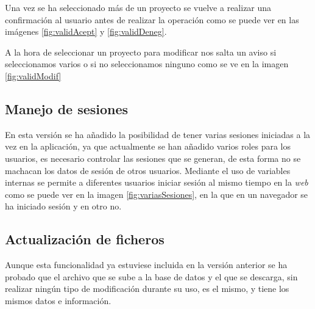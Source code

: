 Una vez se ha seleccionado más de un proyecto se vuelve a realizar una confirmación al usuario antes de realizar la operación como se puede ver en las imágenes \ref{fig:validAcept} y \ref{fig:validDeneg}.


A la hora de seleccionar un proyecto para modificar nos salta un aviso si seleccionamos varios o si no seleccionamos ninguno como se ve en la imagen \ref{fig:validModif}


\subsection{Manejo de sesiones}

En esta versión se ha añadido la posibilidad de tener varias sesiones iniciadas a la vez en la aplicación, ya que actualmente se han añadido varios roles para los usuarios, es necesario controlar las sesiones que se generan, de esta forma no se machacan los datos de sesión de otros usuarios. Mediante el uso de variables internas se permite a diferentes usuarios iniciar sesión al mismo tiempo en la \emph{web} como se puede ver en la imagen \ref{fig:variasSesiones}, en la que en un navegador se ha iniciado sesión y en otro no.


\subsection{Actualización de ficheros}

Aunque esta funcionalidad ya estuviese incluida en la versión anterior se ha probado que el archivo que se sube a la base de datos y el que se descarga, sin realizar ningún tipo de modificación durante su uso, es el mismo, y tiene los mismos datos e información.